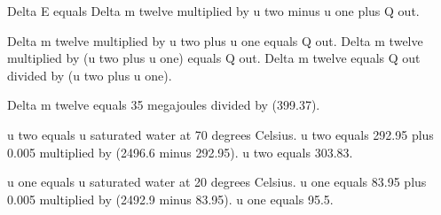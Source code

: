 Delta E equals Delta m twelve multiplied by u two minus u one plus Q out.  

Delta m twelve multiplied by u two plus u one equals Q out.  
Delta m twelve multiplied by (u two plus u one) equals Q out.  
Delta m twelve equals Q out divided by (u two plus u one).  

Delta m twelve equals 35 megajoules divided by (399.37).  

u two equals u saturated water at 70 degrees Celsius.  
u two equals 292.95 plus 0.005 multiplied by (2496.6 minus 292.95).  
u two equals 303.83.  

u one equals u saturated water at 20 degrees Celsius.  
u one equals 83.95 plus 0.005 multiplied by (2492.9 minus 83.95).  
u one equals 95.5.